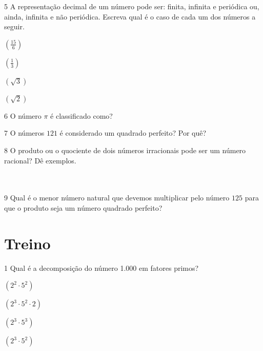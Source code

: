 
\pagebreak

\num{5} A representação decimal de um número pode ser: finita, infinita e
periódica ou, ainda, infinita e não periódica. Escreva qual é o caso de
cada um dos números a seguir.

\begin{escolha}[itemsep=0pt]
\item $(\frac{15}{6})$ 
\item $(\frac{1}{3})$ 
\item $(\sqrt{3})$ 
\item $(\sqrt{2})$ 
\end{escolha}


\num{6} O número $\pi$ é classificado como?


\num{7} O números $121$ é considerado um quadrado perfeito? Por quê?


\num{8} O produto ou o quociente de dois números irracionais pode ser um
número racional? Dê exemplos.

\\
\\


\num{9} Qual é o menor número natural que devemos multiplicar pelo número
$125$ para que o produto seja um número quadrado perfeito?


\section*{Treino}

\num{1} Qual é a decomposição do número 1.000 em fatores primos?

\begin{escolha}[itemsep=0pt]
\item $(2^2 \cdot 5^2)$
\item $(2^3 \cdot 5^2 \cdot 2)$
\item $(2^3 \cdot 5^3)$
\item $(2^3 \cdot 5^2)$
\end{escolha}



